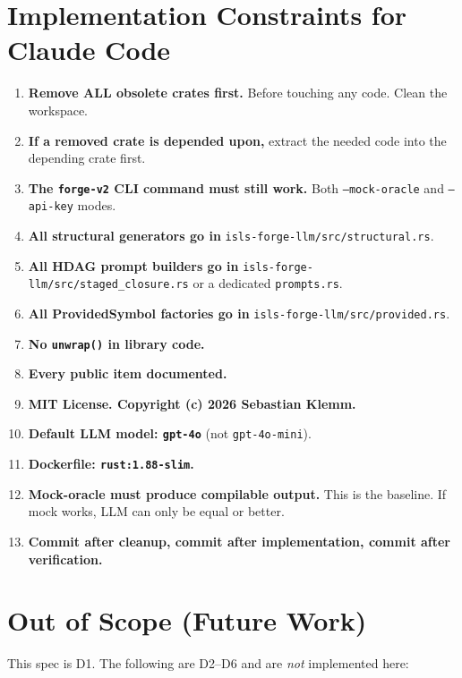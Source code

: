 \documentclass[11pt,a4paper]{article}
\begin{document}
\section{Implementation Constraints for Claude Code}

\begin{enumerate}
\item \textbf{Remove ALL obsolete crates first.} Before touching any code. Clean the workspace.
\item \textbf{If a removed crate is depended upon,} extract the needed code into the depending crate first.
\item \textbf{The \texttt{forge-v2} CLI command must still work.} Both \texttt{--mock-oracle} and \texttt{--api-key} modes.
\item \textbf{All structural generators go in} \texttt{isls-forge-llm/src/structural.rs}.
\item \textbf{All HDAG prompt builders go in} \texttt{isls-forge-llm/src/staged\_closure.rs} or a dedicated \texttt{prompts.rs}.
\item \textbf{All ProvidedSymbol factories go in} \texttt{isls-forge-llm/src/provided.rs}.
\item \textbf{No \texttt{unwrap()} in library code.}
\item \textbf{Every public item documented.}
\item \textbf{MIT License. Copyright (c) 2026 Sebastian Klemm.}
\item \textbf{Default LLM model: \texttt{gpt-4o}} (not \texttt{gpt-4o-mini}).
\item \textbf{Dockerfile: \texttt{rust:1.88-slim}.}
\item \textbf{Mock-oracle must produce compilable output.} This is the baseline. If mock works, LLM can only be equal or better.
\item \textbf{Commit after cleanup, commit after implementation, commit after verification.}
\end{enumerate}

\section{Out of Scope (Future Work)}

This spec is D1. The following are D2--D6 and are \emph{not} implemented here:
\end{document}
